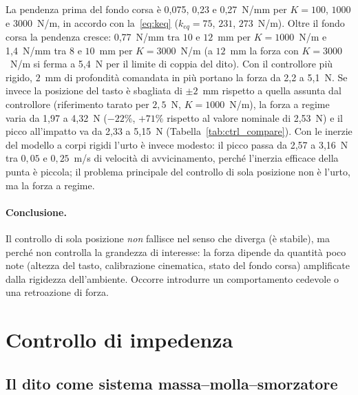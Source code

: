 La pendenza prima del fondo corsa è 0,075, 0,23 e 0,27~N/mm per $K=100$, $1000$ e $3000$~N/m, in accordo con la~\eqref{eq:keq} ($k_{eq}=75$, $231$, $273$~N/m). Oltre il fondo corsa la pendenza cresce: 0,77~N/mm tra $10$ e $12$~mm per $K=1000$~N/m e 1,4~N/mm tra $8$ e $10$~mm per $K=3000$~N/m (a $12$~mm la forza con $K=3000$~N/m si ferma a 5,4~N per il limite di coppia del dito). Con il controllore più rigido, $2$~mm di profondità comandata in più portano la forza da 2,2 a 5,1~N. Se invece la posizione del tasto è sbagliata di $\pm2$~mm rispetto a quella assunta dal controllore (riferimento tarato per $2{,}5$~N, $K=1000$~N/m), la forza a regime varia da 1,97 a 4,32~N ($-22\%$, $+71\%$ rispetto al valore nominale di 2,53~N) e il picco all'impatto va da 2,33 a 5,15~N (Tabella~\ref{tab:ctrl_compare}). Con le inerzie del modello a corpi rigidi l'urto è invece modesto: il picco passa da 2,57 a 3,16~N tra $0{,}05$ e $0{,}25$~m/s di velocità di avvicinamento, perché l'inerzia efficace della punta è piccola; il problema principale del controllo di sola posizione non è l'urto, ma la forza a regime.

\paragraph{Conclusione.} Il controllo di sola posizione \emph{non} fallisce nel senso che diverga (è stabile), ma perché non controlla la grandezza di interesse: la forza dipende da quantità poco note (altezza del tasto, calibrazione cinematica, stato del fondo corsa) amplificate dalla rigidezza dell'ambiente. Occorre introdurre un comportamento cedevole o una retroazione di forza.

\section{Controllo di impedenza}
\label{sec:ctrl_impedenza}

\subsection{Il dito come sistema massa--molla--smorzatore}


